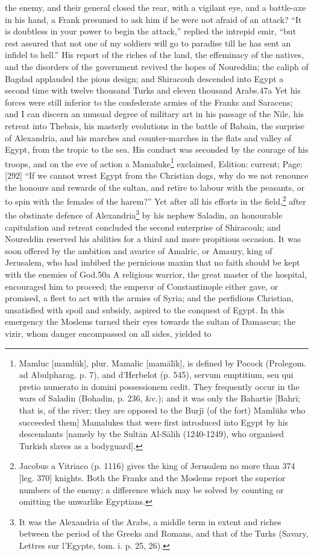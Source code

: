 the enemy, and their general closed the rear, with a vigilant eye, and a battle-axe in his hand, a Frank presumed to ask him if he were not afraid of an attack? \texthebrew{“}It is doubtless in your power to begin the attack,\texthebrew{}” replied the intrepid emir, \texthebrew{“}but rest assured that not one of my soldiers will go to paradise till he has sent an infidel to hell.\texthebrew{}” His report of the riches of the land, the effeminacy of the natives, and the disorders of the government revived the hopes of Noureddin; the caliph of Bagdad applauded the pious design; and Shiracouh descended into Egypt a second time with twelve thousand Turks and eleven thousand Arabs.47a Yet his forces were still inferior to the confederate armies of the Franks and Saracens; and I can discern an unusual degree of military art in his passage of the Nile, his retreat into Thebais, his masterly evolutions in the battle of Babain, the surprise of Alexandria, and his marches and counter-marches in the flats and valley of Egypt, from the tropic to the sea. His conduct was seconded by the courage of his troops, and on the eve of action a Mamaluke\footnote{Mamluc [mamlūk], plur. Mamalic [mamālīk], is defined by Pocock (Prolegom. ad Abulpharag. p. 7), and d\texthebrew{}’Herbelot (p. 545), servum emptitium, seu qui pretio numerato in domini possessionem cedit. They frequently occur in the wars of Saladin (Bohadin, p. 236, \&c.); and it was only the Bahartie [Bahrī; that is, of the river; they are opposed to the Burjī (of the fort) Mamlūks who succeeded them] Mamalukes that were first introduced into Egypt by his descendants [namely by the Sultān Al-Sālih (1240-1249), who organised Turkish slaves as a bodyguard].} exclaimed, Edition: current; Page: [292] \texthebrew{“}If we cannot wrest Egypt from the Christian dogs, why do we not renounce the honours and rewards of the sultan, and retire to labour with the peasants, or to spin with the females of the harem?\texthebrew{}” Yet after all his efforts in the field,\footnote{Jacobus a Vitriaco (p. 1116) gives the king of Jerusalem no more than 374 [leg. 370] knights. Both the Franks and the Moslems report the superior numbers of the enemy; a difference which may be solved by counting or omitting the unwarlike Egyptians.} after the obstinate defence of Alexandria\footnote{It was the Alexandria of the Arabs, a middle term in extent and riches between the period of the Greeks and Romans, and that of the Turks (Savary, Lettres sur l\texthebrew{}’Egypte, tom. i. p. 25, 26).} by his nephew Saladin, an honourable capitulation and retreat concluded the second enterprise of Shiracouh; and Noureddin reserved his abilities for a third and more propitious occasion. It was soon offered by the ambition and avarice of Amalric, or Amaury, king of Jerusalem, who had imbibed the pernicious maxim that no faith should be kept with the enemies of God.50a A religious warrior, the great master of the hospital, encouraged him to proceed; the emperor of Constantinople either gave, or promised, a fleet to act with the armies of Syria; and the perfidious Christian, unsatisfied with spoil and subsidy, aspired to the conquest of Egypt. In this emergency the Moslems turned their eyes towards the sultan of Damascus; the vizir, whom danger encompassed on all sides, yielded to 